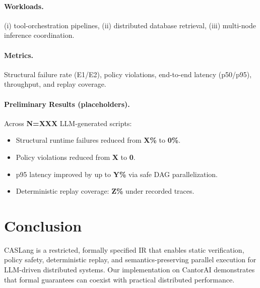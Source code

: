 \documentclass[sigplan,nonacm,10pt]{acmart}
\begin{document}
\paragraph{Workloads.} (i) tool-orchestration pipelines, (ii) distributed database retrieval, (iii) multi-node inference coordination.

\paragraph{Metrics.} Structural failure rate (E1/E2), policy violations, end-to-end latency (p50/p95), throughput, and replay coverage.

\paragraph{Preliminary Results (placeholders).}
Across \textbf{N=XXX} LLM-generated scripts:
\begin{itemize}\itemsep2pt
\item Structural runtime failures reduced from \textbf{X\%} to \textbf{0\%}.
\item Policy violations reduced from \textbf{X} to \textbf{0}.
\item p95 latency improved by up to \textbf{Y\%} via safe DAG parallelization.
\item Deterministic replay coverage: \textbf{Z\%} under recorded traces.
\end{itemize}

\section{Conclusion}
CASLang is a restricted, formally specified IR that enables static verification, policy safety, deterministic replay, and semantics-preserving parallel execution for LLM-driven distributed systems. Our implementation on CantorAI demonstrates that formal guarantees can coexist with practical distributed performance.
\end{document}

